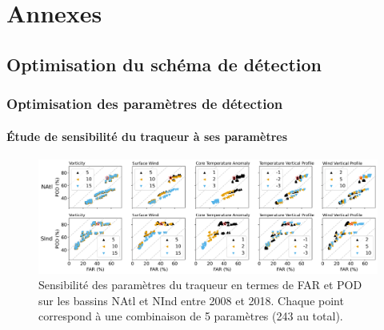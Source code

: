 \documentclass[aspectratio=169, usepdftitle=false, xcolor={dvipsnames}, 9pt,table]{beamer}
\begin{document}
\appendix
\section*{Annexes}
\subsection*{Optimisation du schéma de détection}

\begin{frame}[c]
    \frametitle{Optimisation des paramètres de détection}
    \framesubtitle{Étude de sensibilité du traqueur à ses paramètres}
    \begin{figure}
        \centering
        \includegraphics[width=\textwidth]{Figures/optimisation_vectors.png}
        \caption{\small Sensibilité des paramètres du traqueur en termes de FAR et POD sur les bassins NAtl et NInd entre 2008 et 2018. Chaque point correspond
        à une combinaison de 5 paramètres (243 au total).}
    \end{figure}
\end{frame}

\end{document}

